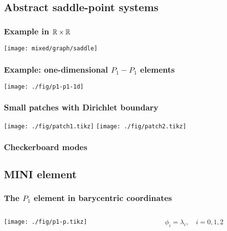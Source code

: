 \documentclass[american,notheorems]{beamer}
\begin{document}
\subsection{Abstract saddle-point systems}

\begin{frame}
  \frametitle{Example in $\mathbb R\times \mathbb R$}
  \centering
  \texttt{[image: mixed/graph/saddle]}
\end{frame}
\begin{frame}
  \frametitle{Example: one-dimensional $P_1-P_1$ elements}
  \begin{center}
      \texttt{[image: ./fig/p1-p1-1d]}
  \end{center}
\end{frame}

\begin{frame}
  \frametitle{Small patches with Dirichlet boundary}
  \begin{center}
    \hfill
    \texttt{[image: ./fig/patch1.tikz]}
    \hfill
    \texttt{[image: ./fig/patch2.tikz]}
    \hfill\mbox{}
  \end{center}
\end{frame}

\begin{frame}
  \frametitle{Checkerboard modes}
  
\end{frame}

\subsection{MINI element}

\begin{frame}
  \frametitle{The $P_1$ element in barycentric coordinates}
  \begin{columns}
    \begin{column}{.5\textwidth}
      \begin{center}
        \texttt{[image: ./fig/p1-p.tikz]}
      \end{center}
    \end{column}
    \begin{column}{.5\textwidth}
      \begin{gather}
        \phi_i = \lambda_i,
        \quad i=0,1,2
      \end{gather}
    \end{column}
  \end{columns}
\end{frame}
\end{document}
